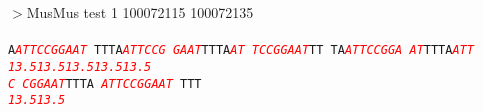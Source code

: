 \documentclass[11pt,twoside,reqno,a4paper]{article}
\begin{document}
\noindent
\newlength{\charwidth}$>$MusMus	test	1	100072115	100072135 \\
 \\
\texttt{A\textit{\textcolor{red}{A}}\textit{\textcolor{red}{T}}\textit{\textcolor{red}{T}}\textit{\textcolor{red}{C}}\textit{\textcolor{red}{C}}\textit{\textcolor{red}{G}}\textit{\textcolor{red}{G}}\textit{\textcolor{red}{A}}\textit{\textcolor{red}{A}}\textit{\textcolor{red}{T}}	TTTA\textit{\textcolor{red}{A}}\textit{\textcolor{red}{T}}\textit{\textcolor{red}{T}}\textit{\textcolor{red}{C}}\textit{\textcolor{red}{C}}\textit{\textcolor{red}{G}}	\textit{\textcolor{red}{G}}\textit{\textcolor{red}{A}}\textit{\textcolor{red}{A}}\textit{\textcolor{red}{T}}TTTA\textit{\textcolor{red}{A}}\textit{\textcolor{red}{T}}	\textit{\textcolor{red}{T}}\textit{\textcolor{red}{C}}\textit{\textcolor{red}{C}}\textit{\textcolor{red}{G}}\textit{\textcolor{red}{G}}\textit{\textcolor{red}{A}}\textit{\textcolor{red}{A}}\textit{\textcolor{red}{T}}TT	TA\textit{\textcolor{red}{A}}\textit{\textcolor{red}{T}}\textit{\textcolor{red}{T}}\textit{\textcolor{red}{C}}\textit{\textcolor{red}{C}}\textit{\textcolor{red}{G}}\textit{\textcolor{red}{G}}\textit{\textcolor{red}{A}}	\textit{\textcolor{red}{A}}\textit{\textcolor{red}{T}}TTTA\textit{\textcolor{red}{A}}\textit{\textcolor{red}{T}}\textit{\textcolor{red}{T}}\\
\hspace*{1\charwidth}\textit{\textcolor{red}{13.5}}\hspace*{1\charwidth}\hspace*{10\charwidth}\textit{\textcolor{red}{13.5}}\hspace*{1\charwidth}\hspace*{10\charwidth}\textit{\textcolor{red}{13.5}}\hspace*{1\charwidth}\hspace*{1\charwidth}\hspace*{10\charwidth}\textit{\textcolor{red}{13.5}}\hspace*{1\charwidth}\hspace*{10\charwidth}\textit{\textcolor{red}{13.5}}\hspace*{1\charwidth}\\
\textit{\textcolor{red}{C}}	\textit{\textcolor{red}{C}}\textit{\textcolor{red}{G}}\textit{\textcolor{red}{G}}\textit{\textcolor{red}{A}}\textit{\textcolor{red}{A}}\textit{\textcolor{red}{T}}TTTA	\textit{\textcolor{red}{A}}\textit{\textcolor{red}{T}}\textit{\textcolor{red}{T}}\textit{\textcolor{red}{C}}\textit{\textcolor{red}{C}}\textit{\textcolor{red}{G}}\textit{\textcolor{red}{G}}\textit{\textcolor{red}{A}}\textit{\textcolor{red}{A}}\textit{\textcolor{red}{T}}	TTT\\
\hspace*{0\charwidth}\textit{\textcolor{red}{13.5}}\hspace*{1\charwidth}\hspace*{1\charwidth}\hspace*{7\charwidth}\textit{\textcolor{red}{13.5}}\hspace*{1\charwidth}\\
}
\end{document}

